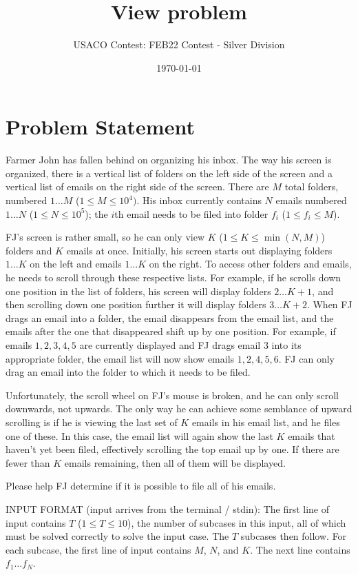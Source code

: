 \documentclass[12pt]{article}
\title{View problem}
\author{USACO Contest: FEB22 Contest - Silver Division}
\date{\today}
\begin{document}
\maketitle

\section*{Problem Statement}

Farmer John has fallen behind on organizing his inbox. The way his screen is
organized, there is a vertical list of folders on the left side of the screen
and a vertical list of emails on the right side of the screen. There are $M$
total folders, numbered $1 \ldots M$ ($1 \le M \le 10^4)$. His inbox currently
contains $N$ emails numbered $1\ldots N$ ($1 \le N \le 10^5$); the $i$th email
needs to be filed into folder $f_i$ ($1\le f_i\le M$). 

FJ's screen is rather small, so he can only view $K$ ($1\le K\le \min(N,M)$)
folders and $K$ emails at once.  Initially, his screen starts out displaying folders
$1 \ldots K$ on the left and emails $1 \ldots K$ on the right.  To access other
folders and emails, he needs to scroll through these respective lists.  For
example, if he scrolls down one position in the list of folders, his screen will display
folders $2 \ldots K+1$, and then scrolling down one position further it will display folders
$3 \ldots K+2$.  When FJ drags an email into a folder, the email disappears from
the email list, and the emails after the one that disappeared shift up by one
position.  For example, if emails $1, 2, 3, 4, 5$ are currently displayed and FJ
drags email 3 into its appropriate folder, the email list will now show emails
$1, 2, 4, 5, 6$.  FJ can only drag an email into the folder to which it needs to
be filed.

Unfortunately, the scroll wheel on FJ's mouse is broken, and he can only scroll
downwards, not upwards.  The only way he can achieve some semblance of upward
scrolling is if he is viewing the last set of $K$ emails in his email list, and
he files one of these.  In this case, the email list will again show the last
$K$ emails that haven't yet been filed, effectively scrolling the top email up
by one. If there are fewer than $K$ emails remaining, then all of them will be
displayed. 

Please help FJ determine if it is possible to file all of his emails.

INPUT FORMAT (input arrives from the terminal / stdin):
The first line of input contains $T$ ($1 \le T \le 10$), the number of subcases
in this input,  all of which must be solved correctly to solve the input case.
The $T$ subcases then follow.  For each subcase, the first line of input
contains $M$, $N$, and $K$. The next line contains $f_1 \ldots f_N$.
\end{document}
